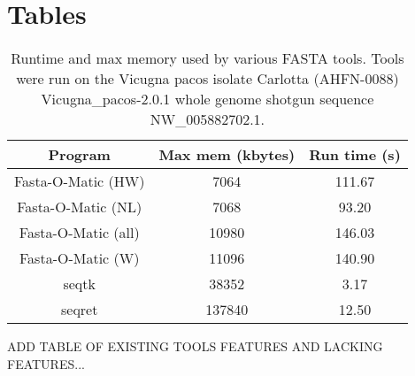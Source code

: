 \section*{Tables}
\begin{table} 
    \begin{tabular}{ c c c }
        Program & Max mem (kbytes) & Run time (s) \\ \hline
        Fasta-O-Matic (HW) & 7064 & 111.67 \\ 
        Fasta-O-Matic (NL) & 7068 & 93.20 \\ 
        Fasta-O-Matic (all) & 10980 & 146.03 \\ 
        Fasta-O-Matic (W) & 11096 & 140.90 \\ 
        seqtk & 38352 & 3.17 \\ 
        seqret & 137840 & 12.50 \\
    \end{tabular} 
    \caption{Runtime and max memory used by various FASTA tools. Tools were run on the Vicugna pacos isolate Carlotta (AHFN-0088) Vicugna_pacos-2.0.1 whole genome shotgun sequence NW_005882702.1.} 
\end{table}

ADD TABLE OF EXISTING TOOLS FEATURES AND LACKING FEATURES...

  
  
  
  
  
  
  